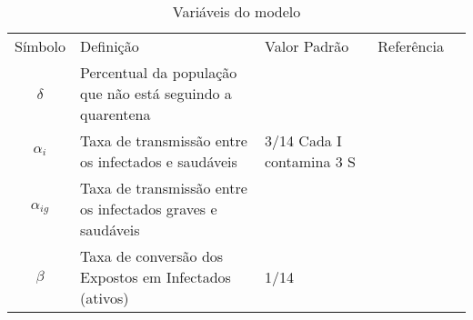 \begin{table}[h!]
\caption{ Variáveis do modelo}
	\begin{tabular}{|c|p{10cm}|p{4cm}|l|l}
		\cline{1-4}
		Símbolo       & Definição                                                                            & Valor Padrão             & Referência &   \\ \cline{1-4}
		$\delta$       & Percentual da população que não está seguindo a quarentena                         &                           &             &   \\ \cline{1-4}
		$\alpha_i$     & Taxa de transmissão entre os infectados e saudáveis                                  & 3/14 Cada I contamina 3 S &             &   \\ \cline{1-4}
		$\alpha_{ig}$  & Taxa de transmissão entre os infectados graves e saudáveis                           &                           &             &   \\ \cline{1-4}
		$\beta$        & Taxa de conversão dos Expostos em Infectados (ativos)                                 & 1/14                      &             &   \\ \cline{1-4}
																												

\end{tabular}
\end{table}
